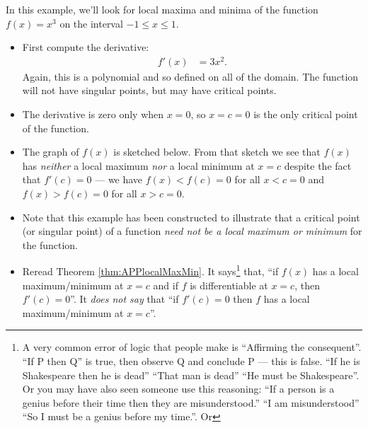 \begin{eg}\label{eg:localMinMaxB}
In this example, we'll look for local maxima and minima of the function
$f(x) = x^3$ on the interval $-1\le x\le 1$.
\begin{itemize}
 \item First compute the derivative:
\begin{align*}
  f'(x) &= 3x^2.
\end{align*}
Again, this is a polynomial and so defined on all of the domain. The function
will not have singular points, but may have critical points.

\item The derivative is zero only when $x=0$, so $x=c=0$ is the only critical
point of the function.
\item The graph of $f(x)$ is sketched below. From that sketch we see that $f(x)$
has \emph{neither} a local maximum \emph{nor} a local minimum at $x=c$ despite
the fact that $f'(c)=0$ --- we have $f(x)<f(c)=0$ for all $x<c=0$ and
$f(x)>f(c)=0$ for all $x>c=0$.
%
\item Note that this example has been constructed to illustrate that a critical
point (or singular point) of a function \emph{need not be a local maximum or
minimum} for the function.
\item Reread Theorem \ref{thm:APPlocalMaxMin}. It says\footnote{A very common
error of logic that people make is ``Affirming the consequent''. ``If P then Q''
is true, then observe Q and conclude P --- this is false. ``If he is Shakespeare then he
is dead'' ``That man is dead'' ``He must be Shakespeare''. Or you may have also seen
someone use this reasoning: ``If a person is a genius before their time then they are
misunderstood.'' ``I am misunderstood'' ``So I must be a genius before my time.''. Or }
that, ``if $f(x)$ has a local maximum/minimum at $x=c$ and if $f$ is differentiable at
$x=c$, then $f'(c)=0$''. It \emph{does not say} that ``if $f'(c)=0$ then $f$
has a local maximum/minimum at $x=c$''.
\end{itemize}
\end{eg}\goodbreak


